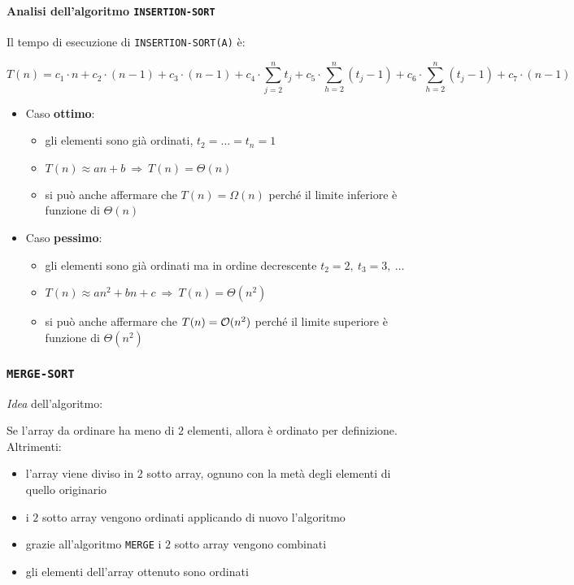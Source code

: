 \documentclass[italian, 10pt]{article}
\begin{document}
\paragraph{Analisi dell'algoritmo \texttt{INSERTION-SORT}}

Il tempo di esecuzione di \texttt{INSERTION-SORT(A)} è:

\[ T(n) = c_1 \cdot n + c_2 \cdot (n-1) + c_3 \cdot (n-1) + c_4 \cdot \displaystyle \sum_{j=2}^n t_j + c_5 \cdot \displaystyle \sum_{h=2}^n (t_j - 1) + c_6 \cdot \displaystyle \sum_{h=2}^n (t_j - 1) + c_7 \cdot (n-1) \]

\begin{itemize}
  \item Caso \textbf{ottimo}:
        \begin{itemize}
          \item gli elementi sono già ordinati, \(t_2 = \ldots = t_n = 1\)
          \item \(T(n) \approx an + b \ \Rightarrow \  T(n) = \Theta(n)\)
          \item si può anche affermare che \(T(n) = \Omega(n)\) perché il limite inferiore è funzione di \(\Theta(n)\)
        \end{itemize}
  \item Caso \textbf{pessimo}:
        \begin{itemize}
          \item gli elementi sono già ordinati ma in ordine decrescente \(t_2 = 2,\ t_3 = 3,\ \ldots\)
          \item \(T(n) \approx an^2 + bn + c \ \Rightarrow \ T(n) = \Theta(n^2)\)
          \item si può anche affermare che \(T(n) = \mathcal{O}(n^2)\) perché il limite superiore è funzione di \(\Theta(n^2)\)
        \end{itemize}
\end{itemize}

\subsubsection{\texttt{MERGE-SORT}}

\textit{Idea} dell'algoritmo:

Se l'array da ordinare ha meno di \(2\) elementi, allora è ordinato per definizione.
Altrimenti:
\begin{itemize}
  \item l'array viene diviso in \(2\) sotto array, ognuno con la metà degli elementi di quello originario
  \item i \(2\) sotto array vengono ordinati applicando di nuovo l'algoritmo
  \item grazie all'algoritmo \texttt{MERGE} i \(2\) sotto array vengono combinati
  \item gli elementi dell'array ottenuto sono ordinati
\end{itemize}
\end{document}
